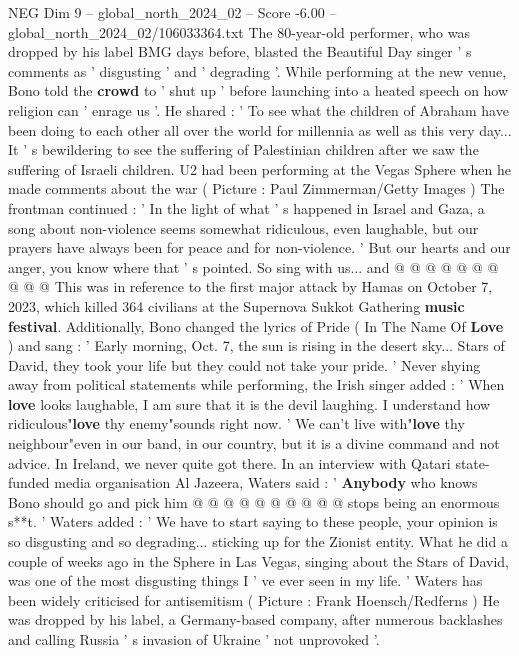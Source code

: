 \begin{textsample}{NEG Dim 9 – global\_north\_2024\_02 – Score -6.00 – global\_north\_2024\_02/106033364.txt}  \label{ex:f9_neg_283}
The 80-year-old performer, who was dropped by his label BMG days before, blasted the Beautiful Day singer ' s comments as ' disgusting ' and ' degrading '.
While performing at the new venue, Bono told the \textbf{crowd} to ' shut up ' before launching into a heated speech on how religion can ' enrage us '.
He shared : ' To see what the children of Abraham have been doing to each other all over the world for millennia as well as this very day...
It ' s bewildering to see the suffering of Palestinian children after we saw the suffering of Israeli children.
U2 had been performing at the Vegas Sphere when he made comments about the war ( Picture : Paul Zimmerman/Getty Images ) The frontman continued : ' In the light of what ' s happened in Israel and Gaza, a song about non-violence seems somewhat ridiculous, even laughable, but our prayers have always been for peace and for non-violence. ' But our hearts and our anger, you know where that ' s pointed.
So sing with us... and @ @ @ @ @ @ @ @ @ @ This was in reference to the first major attack by Hamas on October 7, 2023, which killed 364 civilians at the Supernova Sukkot Gathering \textbf{music} \textbf{festival}.
Additionally, Bono changed the lyrics of Pride ( In The Name Of \textbf{Love} ) and sang : ' Early morning, Oct. 7, the sun is rising in the desert sky...
Stars of David, they took your life but they could not take your pride. ' Never shying away from political statements while performing, the Irish singer added : ' When \textbf{love} looks laughable, I am sure that it is the devil laughing.
I understand how ridiculous"\textbf{love} thy enemy"sounds right now. ' We can't live with"\textbf{love} thy neighbour"even in our band, in our country, but it is a divine command and not advice.
In Ireland, we never quite got there.
In an interview with Qatari state-funded media organisation Al Jazeera, Waters said : ' \textbf{Anybody} who knows Bono should go and pick him @ @ @ @ @ @ @ @ @ @ stops being an enormous s**t. ' Waters added : ' We have to start saying to these people, your opinion is so disgusting and so degrading... sticking up for the Zionist entity.
What he did a couple of weeks ago in the Sphere in Las Vegas, singing about the Stars of David, was one of the most disgusting things I ' ve ever seen in my life. ' Waters has been widely criticised for antisemitism ( Picture : Frank Hoensch/Redferns ) He was dropped by his label, a Germany-based company, after numerous backlashes and calling Russia ' s invasion of Ukraine ' not unprovoked '.

\end{textsample}
